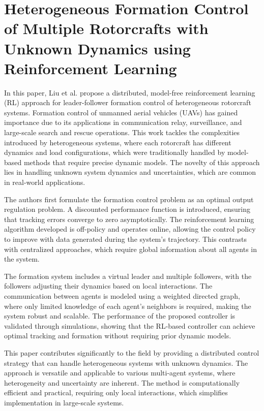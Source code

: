 \documentclass[a4paper,12pt]{article}
\begin{document}
    \section{Heterogeneous Formation Control of Multiple Rotorcrafts with Unknown Dynamics using Reinforcement Learning \cite{liu2019heterogeneous}}
    In this paper, Liu et al. propose a distributed, model-free reinforcement learning (RL) approach for leader-follower formation control of heterogeneous rotorcraft systems. Formation control of unmanned aerial vehicles (UAVs) has gained importance due to its applications in communication relay, surveillance, and large-scale search and rescue operations. This work tackles the complexities introduced by heterogeneous systems, where each rotorcraft has different dynamics and load configurations, which were traditionally handled by model-based methods that require precise dynamic models. The novelty of this approach lies in handling unknown system dynamics and uncertainties, which are common in real-world applications.
    
    The authors first formulate the formation control problem as an optimal output regulation problem. A discounted performance function is introduced, ensuring that tracking errors converge to zero asymptotically. The reinforcement learning algorithm developed is off-policy and operates online, allowing the control policy to improve with data generated during the system’s trajectory. This contrasts with centralized approaches, which require global information about all agents in the system.
    
    The formation system includes a virtual leader and multiple followers, with the followers adjusting their dynamics based on local interactions. The communication between agents is modeled using a weighted directed graph, where only limited knowledge of each agent's neighbors is required, making the system robust and scalable. The performance of the proposed controller is validated through simulations, showing that the RL-based controller can achieve optimal tracking and formation without requiring prior dynamic models.
    
    This paper contributes significantly to the field by providing a distributed control strategy that can handle heterogeneous systems with unknown dynamics. The approach is versatile and applicable to various multi-agent systems, where heterogeneity and uncertainty are inherent. The method is computationally efficient and practical, requiring only local interactions, which simplifies implementation in large-scale systems.
    
\end{document}
